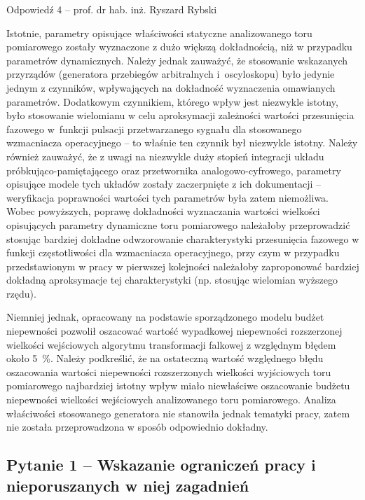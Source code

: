 \documentclass[12pt, polish, aspectratio = 169]{slides}
\begin{document}
\begin{frame}[allowframebreaks]{Odpowiedź 4 -- prof. dr hab. inż. Ryszard Rybski}\small
\begin{justify}
Istotnie, parametry opisujące właściwości statyczne analizowanego toru pomiarowego zostały wyznaczone z dużo większą dokładnością, niż w przypadku parametrów dynamicznych. Należy jednak zauważyć, że stosowanie wskazanych przyrządów (generatora przebiegów arbitralnych i oscyloskopu) było jedynie jednym z czynników, wpływających na dokładność wyznaczenia omawianych parametrów. Dodatkowym czynnikiem, którego wpływ jest niezwykle istotny, było stosowanie wielomianu w celu aproksymacji zależności wartości przesunięcia fazowego w funkcji pulsacji przetwarzanego sygnału dla stosowanego wzmacniacza operacyjnego -- to właśnie ten czynnik był niezwykle istotny. Należy również zauważyć, że z uwagi na niezwykle duży stopień integracji układu próbkująco-pamiętającego oraz przetwornika analogowo-cyfrowego, parametry opisujące modele tych układów zostały zaczerpnięte z ich dokumentacji -- weryfikacja poprawności wartości tych parametrów była zatem niemożliwa. Wobec powyższych, poprawę dokładności wyznaczania wartości wielkości opisujących parametry dynamiczne toru pomiarowego należałoby przeprowadzić stosując bardziej dokładne odwzorowanie charakterystyki przesunięcia fazowego w funkcji częstotliwości dla wzmacniacza operacyjnego, przy czym w przypadku przedstawionym w pracy w pierwszej kolejności należałoby zaproponować bardziej dokładną aproksymacje tej charakterystyki (np. stosując wielomian wyższego rzędu).

Niemniej jednak, opracowany na podstawie sporządzonego modelu budżet niepewności pozwolił oszacować wartość wypadkowej niepewności rozszerzonej wielkości wejściowych algorytmu transformacji falkowej z względnym błędem około \qty{5}{\percent}. Należy podkreślić, że na ostateczną wartość względnego błędu oszacowania wartości niepewności rozszerzonych wielkości wyjściowych toru pomiarowego najbardziej istotny wpływ miało niewłaściwe oszacowanie budżetu niepewności wielkości wejściowych analizowanego toru pomiarowego. Analiza właściwości stosowanego generatora nie stanowiła jednak tematyki pracy, zatem nie została przeprowadzona w sposób odpowiednio dokładny.
\end{justify}
\end{frame}


\subsection{Pytanie 1 -- Wskazanie ograniczeń pracy i nieporuszanych w niej zagadnień}
\end{document}

